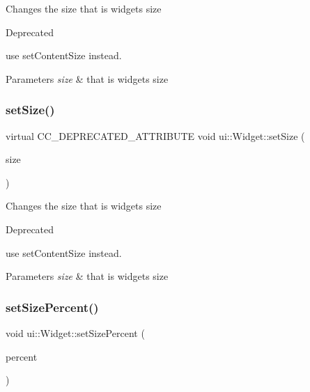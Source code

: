 Changes the size that is widget\textquotesingle{}s size \begin{DoxyRefDesc}{Deprecated}
\item[\hyperlink{deprecated__deprecated000178}{Deprecated}]use {\ttfamily set\+Content\+Size} instead. \end{DoxyRefDesc}

\begin{DoxyParams}{Parameters}
{\em size} & that is widget\textquotesingle{}s size \\
\hline
\end{DoxyParams}
\mbox{\label{classui_1_1Widget_aac333fa30ce7350fbf9283e690959a58}} 
\subsubsection{\texorpdfstring{set\+Size()}{setSize()}\hspace{0.1cm}{\footnotesize\ttfamily [2/2]}}
{\footnotesize\ttfamily virtual C\+C\+\_\+\+D\+E\+P\+R\+E\+C\+A\+T\+E\+D\+\_\+\+A\+T\+T\+R\+I\+B\+U\+TE void ui\+::\+Widget\+::set\+Size (\begin{DoxyParamCaption}\item[{const \hyperlink{classSize}{Size} \&}]{size }\end{DoxyParamCaption})\hspace{0.3cm}{\ttfamily [virtual]}}

Changes the size that is widget\textquotesingle{}s size \begin{DoxyRefDesc}{Deprecated}
\item[\hyperlink{deprecated__deprecated000413}{Deprecated}]use {\ttfamily set\+Content\+Size} instead. \end{DoxyRefDesc}

\begin{DoxyParams}{Parameters}
{\em size} & that is widget\textquotesingle{}s size \\
\hline
\end{DoxyParams}
\mbox{\label{classui_1_1Widget_a326cd8ebfd27b65d8def2976daa8481d}} 
\subsubsection{\texorpdfstring{set\+Size\+Percent()}{setSizePercent()}\hspace{0.1cm}{\footnotesize\ttfamily [1/2]}}
{\footnotesize\ttfamily void ui\+::\+Widget\+::set\+Size\+Percent (\begin{DoxyParamCaption}\item[{const \hyperlink{classVec2}{Vec2} \&}]{percent }\end{DoxyParamCaption})\hspace{0.3cm}{\ttfamily [virtual]}}

